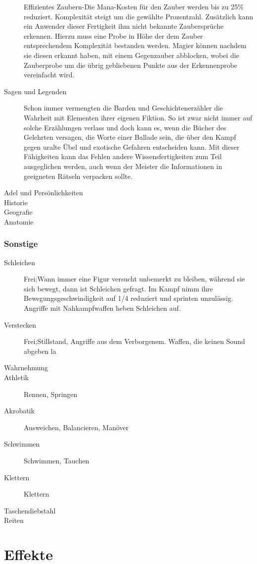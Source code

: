 \documentclass[a4paper,12pt,oneside]{book}
\begin{document}
\begin{description}
Effizientes Zaubern-Die Mana-Kosten für den Zauber werden bis zu 25\% reduziert. Komplexität steigt um die gewählte Prozentzahl.
Zusätzlich kann ein Anwender dieser Fertigkeit ihm nicht bekannte Zaubersprüche erkennen. Hierzu muss eine Probe in Höhe der dem Zauber entsprechendem Komplexität bestanden werden. Magier können nachdem sie diesen erkannt haben, mit einem Gegenzauber abblocken, wobei die Zauberprobe um die übrig gebliebenen Punkte aus der Erkennenprobe vereinfacht wird.
\item[Sagen und Legenden]Schon immer vermengten die Barden und Geschichtenerzähler die Wahrheit mit Elementen ihrer eigenen Fiktion. So ist zwar nicht immer auf solche Erzählungen verlass und doch kann es, wenn die Bücher des Gelehrten versagen, die Worte einer Ballade sein, die über den Kampf gegen uralte Übel und exotische Gefahren entscheiden kann. Mit dieser Fähigkeiten kann das Fehlen andere Wissensfertigkeiten zum Teil ausgeglichen werden, auch wenn der Meister die Informationen in geeigneten Rätseln verpacken sollte.
\item[Adel und Persönlichkeiten]
\item[Historie]
\item[Geografie]
\item[Anatomie]
\end{description}
\subsection{Sonstige}
\begin{description}
\item[Schleichen]Frei;Wann immer eine Figur versucht unbemerkt zu bleiben, während sie sich bewegt, dann ist Schleichen gefragt. Im Kampf nimm ihre Bewegungsgeschwindigkeit auf 1/4 reduziert und sprinten unzulässig. Angriffe mit Nahkampfwaffen heben Schleichen auf.
\item[Verstecken]Frei;Stillstand, Angriffe aus dem Verborgenem. Waffen, die keinen Sound abgeben la
\item[Wahrnehmung]
\item[Athletik]Rennen, Springen 
\item[Akrobatik]Ausweichen, Balancieren, Manöver
\item[Schwimmen]Schwimmen, Tauchen
\item[Klettern]Klettern
\item[Taschendiebstahl]
\item[Reiten]
\end{description}
\chapter{Effekte}
\end{document}

